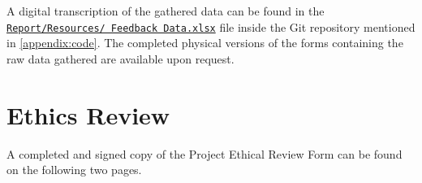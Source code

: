 		A digital transcription of the gathered data can be found in the \href{https://github.com/nboxhallburnett/IndividualProject/blob/master/Report/Resources/Feedback\%20Data.xlsx?raw=true}{\texttt{Report/Resources/ Feedback Data.xlsx}} file inside the Git repository mentioned in \autoref{appendix:code}.
		The completed physical versions of the forms containing the raw data gathered are available upon request.

		

	\section{Ethics Review}
	\label{appendix:ethics}
		A completed and signed copy of the Project Ethical Review Form can be found on the following two pages.

		
